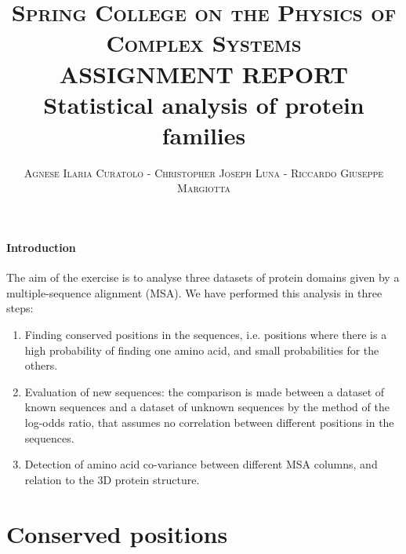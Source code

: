 \documentclass[paper=a4, fontsize=10pt]{article} %
\title{	
\normalfont \normalsize 
\textsc{Spring College on the Physics of Complex Systems} \\ [25pt] %
ASSIGNMENT REPORT  \\ %
\huge Statistical analysis of protein families 
}
\author{\small{\textsc{Agnese Ilaria Curatolo - Christopher Joseph Luna - Riccardo Giuseppe Margiotta}}}
\date{\vspace{-5EX}}
\numberwithin{equation}{section} %
\numberwithin{figure}{section} %
\numberwithin{table}{section} %
\begin{document}
\maketitle

\paragraph{\textbf{Introduction}} The aim of the exercise is to analyse three datasets of protein domains given by a multiple-sequence alignment (MSA). %
We have performed this analysis in three steps:
\begin{enumerate}
\item Finding conserved positions in the sequences, i.e. positions where there is a high probability of finding one amino acid, and small probabilities for the others.
\item Evaluation of new sequences: the comparison is made between a dataset of known sequences and a dataset of unknown sequences by the method of the log-odds ratio, that assumes no correlation between different positions in the sequences.
\item Detection of amino acid co-variance between different MSA columns, and relation to the 3D protein structure.
\end{enumerate}



\section{\textbf{Conserved positions}}

\end{document}

